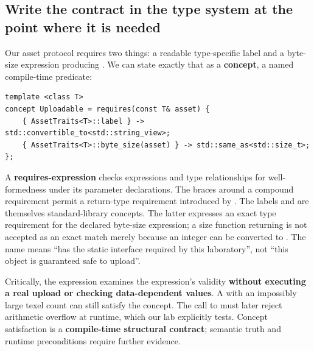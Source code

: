 \subsection{Write the contract in the type system at the point where it is needed}\label{01-foundations-i-ch005-write-the-contract-in-the-type-system-at-the-point-where-it-is-needed}

\hypertarget{01-foundations-i-ch005-write-the-contract-in-the-type-system-at-the-point-where-it-is-needed}{}

Our asset protocol requires two things: a readable type-specific label and a byte-size expression producing . We can state exactly that as a \textbf{concept}, a named compile-time predicate:

\begin{verbatim}
template <class T>
concept Uploadable = requires(const T& asset) {
    { AssetTraits<T>::label } -> std::convertible_to<std::string_view>;
    { AssetTraits<T>::byte_size(asset) } -> std::same_as<std::size_t>;
};
\end{verbatim}

A \textbf{requires-expression} checks expressions and type relationships for well-formedness under its parameter declarations. The braces around a compound requirement permit a return-type requirement introduced by \BookInlineCode{-\textgreater{}}. The labels  and  are themselves standard-library concepts. The latter expresses an exact type requirement for the declared byte-size expression; a size function returning  is not accepted as an exact match merely because an integer can be converted to . The name  means ``has the static interface required by this laboratory'', not ``this object is guaranteed safe to upload''.

Critically, the  expression examines the expression's validity \textbf{without executing a real upload or checking data-dependent values}. A  with an impossibly large texel count can still satisfy the concept. The call to  must later reject arithmetic overflow at runtime, which our lab explicitly tests. Concept satisfaction is a \textbf{compile-time structural contract}; semantic truth and runtime preconditions require further evidence.

